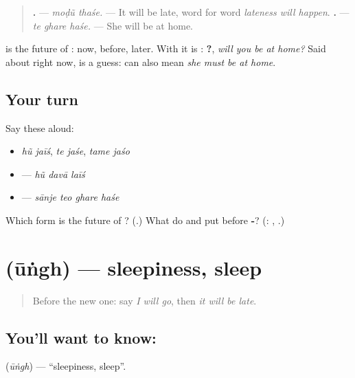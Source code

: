 \begin{quote}
\textbf{ .} — \emph{moḍũ thaśe.} — It will be late, word for word \emph{lateness will happen}. \textbf{  .} — \emph{te ghare haśe.} — She will be at home.
\end{quote}

\textbf{} is the future of \textbf{}: \textbf{} now, \textbf{} before, \textbf{} later. With \textbf{} it is \textbf{}: \textbf{   ?}, \emph{will you be at home?} Said about right now, \textbf{} is a guess: \textbf{  } can also mean \emph{she must be at home}.

\subsection*{Your turn}
Say these aloud:

\begin{itemize}
\raggedright
  \item \emph{hũ jaīś}, \emph{te jaśe}, \emph{tame jaśo}
  \item \textbf{  } — \emph{hũ davā laīś}
  \item \textbf{   } — \emph{sānje teo ghare haśe}
\end{itemize}

\begin{tcolorbox}[breakable,colback=teal!4,colframe=teal!35!black,title={Before you move on}]
Which form is the future of \textbf{}? (\textbf{}.) What do \textbf{} and \textbf{} put before \textbf{-}? (\textbf{}: \textbf{}, \textbf{}.)
\end{tcolorbox}
\section[\texorpdfstring{\gu{ઊંઘ} (ūṅgh)}{ઊંઘ (ūṅgh)}]{ (ūṅgh) — sleepiness, sleep}

\label{lesson:GU-C149-ungh}



\begin{quote}
Before the new one: say \emph{I will go}, then \emph{it will be late}.
\end{quote}

\subsection*{You'll want to know: }
\textbf{} (\emph{ūṅgh}) — \textquotedblleft{}sleepiness, sleep\textquotedblright{}.

